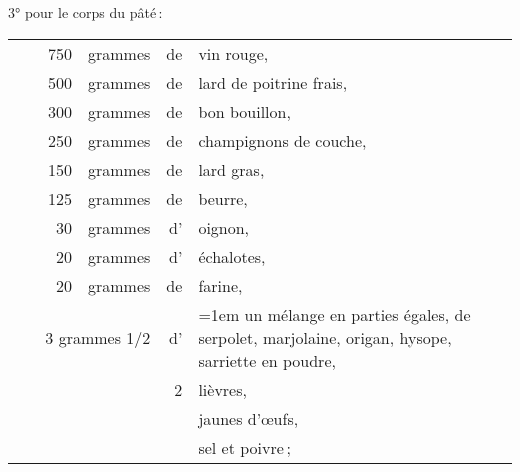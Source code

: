 3° pour le corps du pâté :

\footnotesize
\begin{longtable}{rrrrrp{18em}}
  & \hspace{2em} &  750 & grammes & de & vin rouge,                                                       \\
  & \hspace{2em} &  500 & grammes & de & lard de poitrine frais,                                          \\
  & \hspace{2em} &  300 & grammes & de & bon bouillon,                                                    \\
  & \hspace{2em} &  250 & grammes & de & champignons de couche,                                           \\
  & \hspace{2em} &  150 & grammes & de & lard gras,                                                       \\
  & \hspace{2em} &  125 & grammes & de & beurre,                                                          \\
  & \hspace{2em} &   30 & grammes & d' & oignon,                                                          \\
  & \hspace{2em} &   20 & grammes & d' & échalotes,                                                       \\
  & \hspace{2em} &   20 & grammes & de & farine,                                                          \\
  & \multicolumn{3}{r}{3 grammes 1/2} & d' & \hangindent=1em un mélange en parties égales,
                                        de serpolet, marjolaine, origan, hysope, sarriette en poudre,     \\
  & \hspace{2em} &      &         &  2 & lièvres,                                                         \\
  & \hspace{2em} &      &         &    & jaunes d'œufs,                                                   \\
  & \hspace{2em} &      &         &    & sel et poivre ;                                                  \\
\end{longtable}
\normalsize

